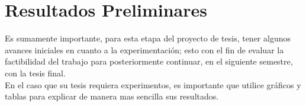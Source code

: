 \chapter{Resultados Preliminares}

Es sumamente importante, para esta etapa del proyecto de  tesis,  tener algunos avances iniciales  en cuanto a la experimentación; esto con el fin de  evaluar la factibilidad del trabajo para posteriormente continuar, en el siguiente semestre, con la tesis final. \\

En el caso que su tesis requiera experimentos, es importante que utilice gráficos y tablas para explicar de manera mas sencilla sus resultados.


